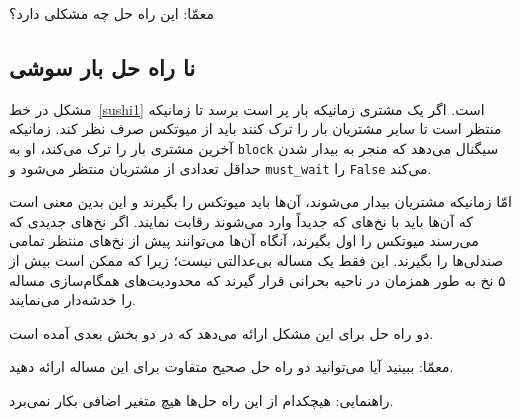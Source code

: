 \documentclass{book}
\newcommand{\clearemptydoublepage}{\newpage\cleardoublepage}
\begin{document}
    معمّا: این راه حل چه مشکلی دارد؟


\clearemptydoublepage
\subsection{نا راه حل بار سوشی}

    مشکل در خط~\ref{sushi1} است. اگر یک مشتری زمانیکه بار پر است برسد تا زمانیکه منتظر است تا سایر مشتریان بار را ترک کنند باید از میوتکس 
    صرف نظر کند. زمانیکه آخرین مشتری بار را ترک می‌کند، او به {\tt block} سیگنال می‌دهد که منجر به بیدار شدن حداقل تعدادی از مشتریان منتظر 
    می‌شود و {\tt must\_wait} را \texttt{False} می‌کند. 
    

    امّا زمانیکه مشتریان بیدار می‌شوند، آن‌ها باید میوتکس را بگیرند و این بدین معنی است که آن‌ها باید با نخ‌های که جدیداً وارد می‌شوند رقابت نمایند. 
    اگر نخ‌های جدیدی که می‌رسند میوتکس را اول بگیرند، آنگاه آن‌ها می‌توانند پیش از نخ‌های منتظر تمامی صندلی‌ها را بگیرند. این فقط یک مساله بی‌عدالتی
    نیست؛ زیرا که ممکن است بیش از ۵ نخ به طور همزمان در ناحیه بحرانی قرار گیرند که محدودیت‌های همگام‌سازی مساله را خدشه‌دار می‌نمایند. 

    دو راه حل برای این مشکل ارائه می‌دهد که در دو بخش بعدی آمده است. 

    معمّا: ببینید آیا می‌توانید دو راه حل صحیح متفاوت برای این مساله ارائه دهید. 

    راهنمایی: هیچکدام از این راه حل‌ها هیچ متغیر اضافی بکار نمی‌برد. 
\end{document}
